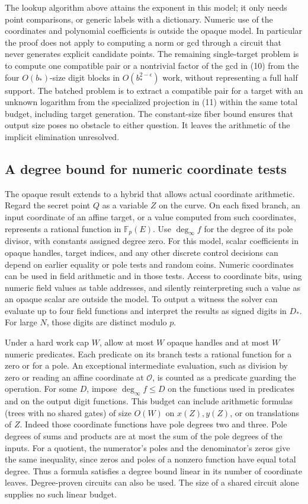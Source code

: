 \documentclass[11pt]{article}
\newcommand{\Fp}{\mathbb F_p}
\newcommand{\OO}{\mathcal O}
\begin{document}
The lookup algorithm above attains the exponent in this model; it only needs point comparisons, or generic labels with a dictionary. Numeric use of the coordinates and polynomial coefficients is outside the opaque model. In particular the proof does not apply to computing a norm or gcd through a circuit that never generates explicit candidate points. The remaining single-target problem is to compute one compatible pair or a nontrivial factor of the gcd in (10) from the four \(O(b_*)\)-size digit blocks in \(O(b_*^{2-\epsilon})\) work, without representing a full half support. The batched problem is to extract a compatible pair for a target with an unknown logarithm from the specialized projection in (11) within the same total budget, including target generation. The constant-size fiber bound ensures that output size poses no obstacle to either question. It leaves the arithmetic of the implicit elimination unresolved.

\subsection*{A degree bound for numeric coordinate tests}

The opaque result extends to a hybrid that allows actual coordinate arithmetic. Regard the secret point \(Q\) as a variable \(Z\) on the curve. On each fixed branch, an input coordinate of an affine target, or a value computed from such coordinates, represents a rational function in \(\Fp(E)\). Use \(\deg_\infty f\) for the degree of its pole divisor, with constants assigned degree zero. For this model, scalar coefficients in opaque handles, target indices, and any other discrete control decisions can depend on earlier equality or pole tests and random coins. Numeric coordinates can be used in field arithmetic and in those tests. Access to coordinate bits, using numeric field values as table addresses, and silently reinterpreting such a value as an opaque scalar are outside the model. To output a witness the solver can evaluate up to four field functions and interpret the results as signed digits in \(D_*\). For large \(N\), those digits are distinct modulo \(p\).

Under a hard work cap \(W\), allow at most \(W\) opaque handles and at most \(W\) numeric predicates. Each predicate on its branch tests a rational function for a zero or for a pole. An exceptional intermediate evaluation, such as division by zero or reading an affine coordinate at \(\OO\), is counted as a predicate guarding the operation. For some \(D\), impose \(\deg_\infty f\le D\) on the functions used in predicates and on the output digit functions. This budget can include arithmetic formulas (trees with no shared gates) of size \(O(W)\) on \(x(Z),y(Z)\), or on translations of \(Z\). Indeed those coordinate functions have pole degrees two and three. Pole degrees of sums and products are at most the sum of the pole degrees of the inputs. For a quotient, the numerator's poles and the denominator's zeros give the same inequality, since zeros and poles of a nonzero function have equal total degree. Thus a formula satisfies a degree bound linear in its number of coordinate leaves. Degree-proven circuits can also be used. The size of a shared circuit alone supplies no such linear budget.
\end{document}
